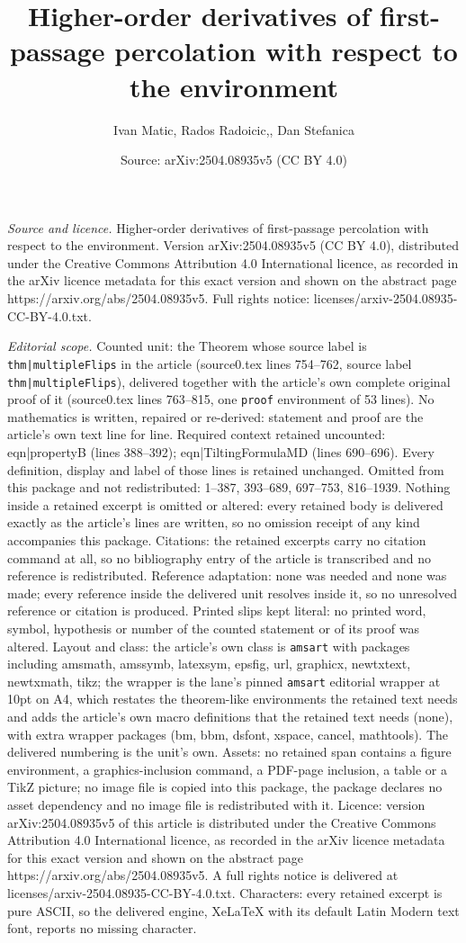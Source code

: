 \documentclass[10pt,a4paper]{amsart}
\title[Higher-order derivatives of first-passage percolation with r]{Higher-order derivatives of first-passage percolation with respect to the environment}
\author{Ivan Matic, Rados Radoicic,, Dan Stefanica}
\date{Source: arXiv:2504.08935v5 (CC BY 4.0)}
\begin{document}
\maketitle

\noindent\emph{Source and licence.} Higher-order derivatives of first-passage percolation with respect to the environment. Version arXiv:2504.08935v5 (CC BY 4.0), distributed under the Creative Commons Attribution 4.0 International licence, as recorded in the arXiv licence metadata for this exact version and shown on the abstract page https://arxiv.org/abs/2504.08935v5. Full rights notice: licenses/arxiv-2504.08935-CC-BY-4.0.txt.\par\smallskip

\noindent\textit{Editorial scope.} Counted unit: the Theorem whose source label is \texttt{thm|multipleFlips} in the article (source0.tex lines 754--762, source label \texttt{thm|multipleFlips}), delivered together with the article's own complete original proof of it (source0.tex lines 763--815, one \texttt{proof} environment of 53 lines). No mathematics is written, repaired or re-derived: statement and proof are the article's own text line for line. Required context retained uncounted: eqn|propertyB (lines 388--392); eqn|TiltingFormulaMD (lines 690--696). Every definition, display and label of those lines is retained unchanged. Omitted from this package and not redistributed: 1--387, 393--689, 697--753, 816--1939. Nothing inside a retained excerpt is omitted or altered: every retained body is delivered exactly as the article's lines are written, so no omission receipt of any kind accompanies this package. Citations: the retained excerpts carry no citation command at all, so no bibliography entry of the article is transcribed and no reference is redistributed. Reference adaptation: none was needed and none was made; every reference inside the delivered unit resolves inside it, so no unresolved reference or citation is produced. Printed slips kept literal: no printed word, symbol, hypothesis or number of the counted statement or of its proof was altered. Layout and class: the article's own class is \texttt{amsart} with packages including amsmath, amssymb, latexsym, epsfig, url, graphicx, newtxtext, newtxmath, tikz; the wrapper is the lane's pinned \texttt{amsart} editorial wrapper at 10pt on A4, which restates the theorem-like environments the retained text needs and adds the article's own macro definitions that the retained text needs (none), with extra wrapper packages (bm, bbm, dsfont, xspace, cancel, mathtools). The delivered numbering is the unit's own. Assets: no retained span contains a figure environment, a graphics-inclusion command, a PDF-page inclusion, a table or a TikZ picture; no image file is copied into this package, the package declares no asset dependency and no image file is redistributed with it. Licence: version arXiv:2504.08935v5 of this article is distributed under the Creative Commons Attribution 4.0 International licence, as recorded in the arXiv licence metadata for this exact version and shown on the abstract page https://arxiv.org/abs/2504.08935v5. A full rights notice is delivered at licenses/arxiv-2504.08935-CC-BY-4.0.txt. Characters: every retained excerpt is pure ASCII, so the delivered engine, XeLaTeX with its default Latin Modern text font, reports no missing character.
\end{document}
